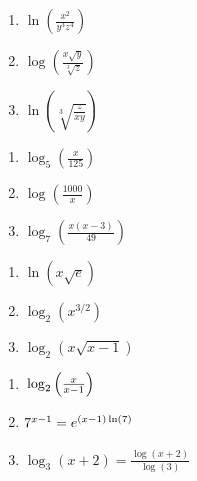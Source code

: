 \documentclass{ximera}
\begin{document}
\begin{multicols}{3}
\begin{enumerate}
\setcounter{enumi}{\value{HW}}


\item $\ln\left( \frac{x^2}{y^3z^4} \right)$
\item $\log\left(\frac{x \sqrt{y}}{\sqrt[3]{z}}  \right)$
\item $\ln\left(\sqrt[3]{\frac{z}{xy}}   \right)$

\setcounter{HW}{\value{enumi}}
\end{enumerate}
\end{multicols}

\begin{multicols}{3}
\begin{enumerate}
\setcounter{enumi}{\value{HW}}

\item $\log_{5}\left(\frac{x}{125}\right)$
\item $\log\left(\frac{1000}{x}\right)$
\item $\log_{7}\left(\frac{x(x - 3)}{49}\right)$

\setcounter{HW}{\value{enumi}}
\end{enumerate}
\end{multicols}

\begin{multicols}{3}
\begin{enumerate}
\setcounter{enumi}{\value{HW}}

\item $\ln \left(x \sqrt{e} \right)$
\item $\log_{2}\left(x^{3/2}\right)$
\item $\log_{2}\left(x \sqrt{x-1}\right)$


\setcounter{HW}{\value{enumi}}
\end{enumerate}
\end{multicols}


\begin{multicols}{3}
\begin{enumerate}
\setcounter{enumi}{\value{HW}}
\item $\vphantom{\frac{\log(x + 2)}{\log(3)}}\log_{2}\left(\frac{x}{x - 1}\right)$ 
\item $\vphantom{\frac{\log(x + 2)}{\log(3)}}7^{x - 1} = e^{(x - 1)\ln(7)}$
\item $\log_{3}(x + 2) = \frac{\log(x + 2)}{\log(3)}$


\setcounter{HW}{\value{enumi}}
\end{enumerate}
\end{multicols}
\end{document}

